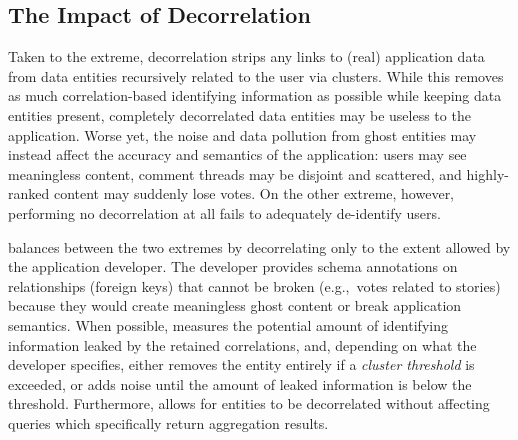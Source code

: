 
\subsection{The Impact of Decorrelation}
Taken to the extreme, decorrelation strips any links to (real) application data from data entities
recursively related to the user via clusters. While this removes as much correlation-based
identifying information as possible while keeping data entities present, completely decorrelated
data entities may be useless to the application. Worse yet, the noise and data pollution from ghost
entities may instead affect the accuracy and semantics of the application: users may see meaningless
content, comment threads may be disjoint and scattered, and highly-ranked content may suddenly lose
votes. On the other extreme, however, performing no decorrelation at all fails to adequately de-identify
users. 

\sys{} balances between the two extremes by decorrelating only to the extent allowed by the
application developer. The developer provides schema annotations on relationships (foreign keys)
that cannot be broken (e.g.,\ votes related to stories) because they would create meaningless ghost
content or break application semantics. When possible, \sys{} measures the potential amount of identifying
information leaked by the retained correlations, and, depending on what the developer specifies,
either removes the entity entirely if a \emph{cluster threshold} is exceeded, or adds noise
until the amount of leaked information is below the threshold.  Furthermore, \sys{} allows for
entities to be decorrelated without affecting queries which specifically return aggregation results.

